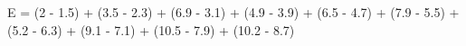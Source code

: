 \documentclass[preview]{standalone}
\begin{document}
\begin{center}
E = (2 - 1.5) + (3.5 - 2.3) + (6.9 - 3.1) + (4.9 - 3.9) + (6.5 - 4.7) + (7.9 - 5.5) + (5.2 - 6.3) + (9.1 - 7.1) + (10.5 - 7.9) + (10.2 - 8.7)
\end{center}
\end{document}
